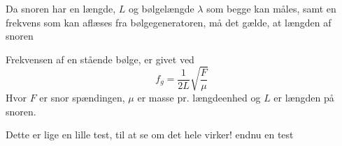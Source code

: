\documentclass[A2_main.tex]{subfiles}
\begin{document}
Da snoren har en længde, $L$ og bølgelængde $\lambda$ som begge kan måles, samt en frekvens som kan aflæses fra bølgegeneratoren, må det gælde, at længden af snoren


Frekvensen af en stående bølge, er givet ved
\begin{equation}
 f_g = \frac{1}{2L}\sqrt{\frac{F}{\mu}}
\end{equation}
Hvor $F$ er snor spændingen, $\mu$ er masse pr. længdeenhed og $L$ er længden på snoren.

Dette er lige en lille test, til at se om det hele virker!
endnu en test
\end{document}

